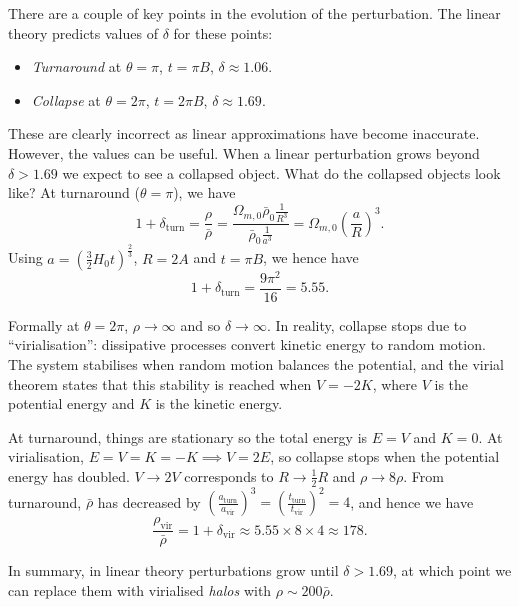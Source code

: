 \documentclass{jknotes}
\begin{document}
There are a couple of key points in the evolution of the perturbation. The linear theory predicts values of \(\delta\) for these points:
\begin{itemize}
    \item \emph{Turnaround} at \(\theta=\pi\), \(t=\pi B\), \(\delta\approx1.06\).
    \item \emph{Collapse} at \(\theta=2\pi\), \(t=2\pi B\), \(\delta\approx1.69\).
\end{itemize}
These are clearly incorrect as linear approximations have become inaccurate. However, the values can be useful. When a linear perturbation grows beyond \(\delta > 1.69\) we expect to see a collapsed object. What do the collapsed objects look like? At turnaround (\(\theta=\pi\)), we have
\begin{equation}
    1+\delta_{\text{turn}} = \frac{\rho}{\bar\rho} = \frac{\Omega_{m,0}\bar\rho_0\frac{1}{R^3}}{\bar\rho_0\frac{1}{a^3}} = \Omega_{m,0} \left(\frac{a}{R}\right)^3.
\end{equation}
Using \(a=\left(\frac32 H_0 t\right)^{\frac23}\), \(R=2A\) and \(t=\pi B\), we hence have
\begin{equation}
    1+\delta_{\text{turn}} = \frac{9\pi^2}{16} = 5.55.
\end{equation}

Formally at \(\theta = 2\pi\), \(\rho\to \infty\) and so \(\delta \to \infty\). In reality, collapse stops due to ``virialisation'': dissipative processes convert kinetic energy to random motion. The system stabilises when random motion balances the potential, and the virial theorem states that this stability is reached when \(V=-2K\), where \(V\) is the potential energy and \(K\) is the kinetic energy.

At turnaround, things are stationary so the total energy is \(E=V\) and \(K=0\). At virialisation, \(E=V=K=-K\implies V=2E\), so collapse stops when the potential energy has doubled. \(V\to 2V\) corresponds to \(R\to \frac12 R\) and \(\rho \to 8\rho\). From turnaround, \(\bar\rho\) has decreased by \(\left(\frac{a_{\text{turn}}}{a_{\text{vir}}}\right)^3 = \left(\frac{t_{\text{turn}}}{t_{\text{vir}}}\right)^2 = 4\), and hence we have
\begin{equation}
    \frac{\rho_{\text{vir}}}{\bar\rho} = 1 + \delta_{\text{vir}} \approx 5.55\times8\times4 \approx 178.
\end{equation}

In summary, in linear theory perturbations grow until \(\delta > 1.69\), at which point we can replace them with virialised \emph{halos} with \(\rho \sim 200 \bar\rho\).
\end{document}
